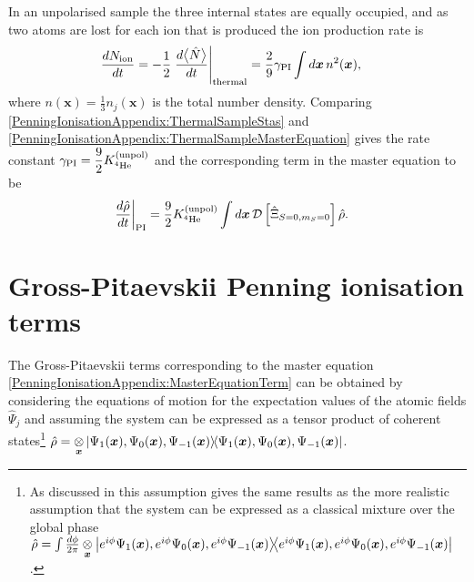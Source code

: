In an unpolarised sample the three internal states are equally occupied, and as two atoms are lost for each ion that is produced the ion production rate is
\begin{align}
    \frac{d N_\text{ion}}{dt} &= -\frac{1}{2} \left.\frac{d \mean{\hat{N}}}{dt}\right|_\text{thermal} = \frac{2}{9} \gamma_\text{PI} \int d \bm{x}\, n^2(\bm{x}),
    \label{PenningIonisationAppendix:ThermalSampleMasterEquation}
\end{align}
where $n(\bm{x}) = \frac{1}{3}n_j(\bm{x})$ is the total number density.
Comparing \eqref{PenningIonisationAppendix:ThermalSampleStas} and \eqref{PenningIonisationAppendix:ThermalSampleMasterEquation}  gives the rate constant $\displaystyle\gamma_\text{PI} = \frac{9}{2} K^\text{(unpol)}_{^4\text{He}}$ and the corresponding term in the master equation to be
\begin{align}
    \label{PenningIonisationAppendix:MasterEquationTerm}
    \left.\frac{d \hat{\rho}}{dt}\right|_\text{PI} &= \frac{9}{2} \Kunpol \int d \bm{x}\, \mathcal{D}\left[ \hat{\Xi}_{S=0, m_S=0}\right] \hat{\rho}.
\end{align}

\section{Gross-Pitaevskii Penning ionisation terms}
\label{PenningIonisationAppendix:GP}

The Gross-Pitaevskii terms corresponding to the master equation \eqref{PenningIonisationAppendix:MasterEquationTerm} can be obtained by considering the equations of motion for the expectation values of the atomic fields $\hat{\Psi}_j$ and assuming the system can be expressed as a tensor product of coherent states\footnote{As discussed in  this assumption gives the same results as the more realistic assumption that the system can be expressed as a classical mixture over the global phase $\hat{\rho} = \int \frac{d\phi}{2\pi}\underset{\bm{x}}{\otimes} \left|e^{i\phi}\Psi_1(\bm{x}), e^{i\phi}\Psi_0(\bm{x}), e^{i\phi}\Psi_{-1}(\bm{x})\middle>\!\middle<e^{i\phi}\Psi_1(\bm{x}), e^{i\phi}\Psi_0(\bm{x}), e^{i\phi}\Psi_{-1}(\bm{x})\right|$.} $\displaystyle\hat{\rho} = \underset{\bm{x}}{\otimes} \left|\Psi_1(\bm{x}), \Psi_0(\bm{x}), \Psi_{-1}(\bm{x})\middle>\!\middle<\Psi_1(\bm{x}), \Psi_0(\bm{x}), \Psi_{-1}(\bm{x})\right|$.

